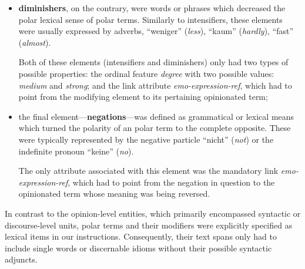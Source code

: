 \begin{itemize}
\item
  \textbf{diminishers}, on the contrary, were words or phrases which
  decreased the polar lexical sense of polar terms.
  Similarly to intensifiers, these elements were usually expressed by
  adverbs, \eg{} ``weniger'' (\emph{less}), ``kaum'' (\emph{hardly}),
  ``fast'' (\emph{almost}).

  Both of these elements (intensifiers and diminishers) only had two
  types of possible properties: the ordinal feature \emph{degree} with
  two possible values: \emph{medium} and \emph{strong}; and the link
  attribute \emph{emo-expression-ref}, which had to point from the
  modifying element to its pertaining opinionated term;

\item the final element---\textbf{negations}---was defined as
  grammatical or lexical means which turned the polarity of an
  polar term to the complete opposite.  These were typically
  represented by the negative particle ``nicht'' (\emph{not}) or the
  indefinite pronoun ``keine'' (\emph{no}).

  The only attribute associated with this element was the mandatory
  link \emph{emo-expression-ref}, which had to point from the negation
  in question to the opinionated term whose meaning was being
  reversed.
\end{itemize}

In contrast to the opinion-level entities, which primarily encompassed
syntactic or discourse-level units, polar terms and their
modifiers were explicitly specified as lexical items in our
instructions.  Consequently, their text spans only had to include
single words or discernable idioms without their possible syntactic
adjuncts.

